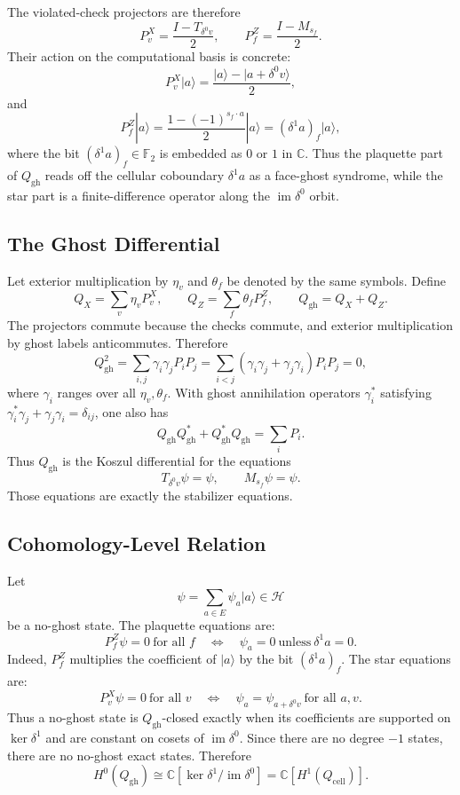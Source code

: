 The violated-check projectors are therefore
\[
  P_v^X=\frac{I-T_{\delta^0v}}{2},\qquad
  P_f^Z=\frac{I-M_{s_f}}{2}.
\]
Their action on the computational basis is concrete:
\[
  P_v^X|a\rangle
  =
  \frac{|a\rangle-|a+\delta^0v\rangle}{2},
\]
and
\[
  P_f^Z|a\rangle
  =
  \frac{1-(-1)^{s_f\cdot a}}{2}|a\rangle
  =
  (\delta^1a)_f|a\rangle,
\]
where the bit \((\delta^1a)_f\in\mathbb F_2\) is embedded as \(0\) or \(1\) in
\(\mathbb C\). Thus the plaquette part of \(Q_{\mathrm{gh}}\) reads off the
cellular coboundary \(\delta^1a\) as a face-ghost syndrome, while the star part
is a finite-difference operator along the \(\operatorname{im}\delta^0\) orbit.

\subsection{The Ghost Differential}

Let exterior multiplication by \(\eta_v\) and \(\theta_f\) be denoted by the
same symbols. Define
\[
  Q_X=\sum_v \eta_v P_v^X,\qquad
  Q_Z=\sum_f \theta_f P_f^Z,\qquad
  Q_{\mathrm{gh}}=Q_X+Q_Z .
\]
The projectors commute because the checks commute, and exterior
multiplication by ghost labels anticommutes. Therefore
\[
  Q_{\mathrm{gh}}^2
  =
  \sum_{i,j}\gamma_i\gamma_jP_iP_j
  =
  \sum_{i<j}(\gamma_i\gamma_j+\gamma_j\gamma_i)P_iP_j
  =0,
\]
where \(\gamma_i\) ranges over all \(\eta_v,\theta_f\). With ghost
annihilation operators \(\gamma_i^*\) satisfying
\(\gamma_i^*\gamma_j+\gamma_j\gamma_i=\delta_{ij}\), one also has
\[
  Q_{\mathrm{gh}}Q_{\mathrm{gh}}^*
  +Q_{\mathrm{gh}}^*Q_{\mathrm{gh}}
  =\sum_iP_i .
\]
Thus \(Q_{\mathrm{gh}}\) is the Koszul differential for the equations
\[
  T_{\delta^0v}\psi=\psi,\qquad M_{s_f}\psi=\psi .
\]
Those equations are exactly the stabilizer equations.

\subsection{Cohomology-Level Relation}

Let
\[
  \psi=\sum_{a\in E}\psi_a|a\rangle\in\mathcal H
\]
be a no-ghost state. The plaquette equations are:
\[
  P_f^Z\psi=0\ \text{for all }f
  \quad\Longleftrightarrow\quad
  \psi_a=0\ \text{unless}\ \delta^1a=0.
\]
Indeed, \(P_f^Z\) multiplies the coefficient of \(|a\rangle\) by the bit
\((\delta^1a)_f\). The star equations are:
\[
  P_v^X\psi=0\ \text{for all }v
  \quad\Longleftrightarrow\quad
  \psi_a=\psi_{a+\delta^0v}\ \text{for all }a,v.
\]
Thus a no-ghost state is \(Q_{\mathrm{gh}}\)-closed exactly when its
coefficients are supported on \(\ker\delta^1\) and are constant on cosets of
\(\operatorname{im}\delta^0\). Since there are no degree \(-1\) states, there
are no no-ghost exact states. Therefore
\[
  H^0(Q_{\mathrm{gh}})
  \cong
  \mathbb C[\ker\delta^1/\operatorname{im}\delta^0]
  =
  \mathbb C[H^1(Q_{\mathrm{cell}})].
\]

